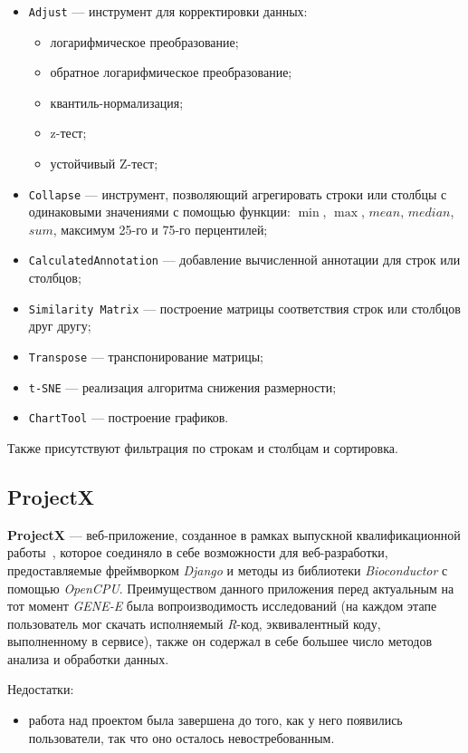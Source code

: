 \begin{itemize}
\item \texttt{Adjust} --- инструмент для корректировки данных:\begin{itemize}
    \item логарифмическое преобразование;
    \item обратное логарифмическое преобразование;
    \item квантиль-нормализация;
    \item z-тест;
    \item устойчивый Z-тест;\end{itemize}
\item \texttt{Collapse} --- инструмент, позволяющий агрегировать строки или столбцы с одинаковыми значениями с помощью функции: $\min$, $\max$, $mean$, $median$, $sum$, максимум 25-го и 75-го перцентилей;
\item \texttt{CalculatedAnnotation} --- добавление вычисленной аннотации для строк или столбцов;
\item \texttt{Similarity Matrix} --- построение матрицы соответствия строк или столбцов друг другу;
\item \texttt{Transpose} --- транспонирование матрицы;
\item \texttt{t-SNE} --- реализация алгоритма снижения размерности;
\item \texttt{ChartTool} --- построение графиков.
\end{itemize}

Также присутствуют фильтрация по строкам и столбцам и сортировка.

\subsection{ProjectX}
\textbf{ProjectX} --- веб-приложение, созданное в рамках выпускной квалификационной работы~\cite{projectx}, которое соединяло в себе возможности для веб-разработки, предоставляемые фреймворком \emph{Django} и методы из библиотеки \emph{Bioconductor} с помощью \emph{OpenCPU}.  Преимуществом данного приложения перед актуальным на тот момент \emph{GENE-E} была вопроизводимость исследований (на каждом этапе пользователь мог скачать исполняемый \emph{R}-код, эквивалентный коду, выполненному в сервисе), также он содержал в себе большее число методов анализа и обработки данных.

Недостатки:
\begin{itemize}
\item работа над проектом была завершена до того, как у него появились пользователи, так что оно осталось невостребованным.
\end{itemize}

